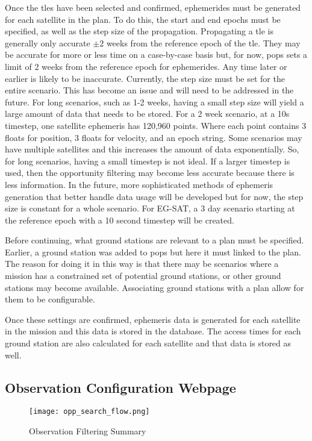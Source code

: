 Once the \glspl{tle} have been selected and confirmed, ephemerides must be
generated for each satellite in the plan. To do this, the start and end epochs
must be specified, as well as the step size of the propagation. Propagating a
\gls{tle} is generally only accurate $\pm 2$ weeks from the reference epoch of
the \gls{tle}. They may be accurate for more or less time on a case-by-case
basis but, for now, \gls{pops} sets a limit of 2 weeks from the reference epoch
for ephemerides. Any time later or earlier is likely to be inaccurate.
Currently, the step size must be set for the entire scenario. This has become
an issue and will need to be addressed in the future. For long scenarios, such
as 1-2 weeks, having a small step size will yield a large amount of data that
needs to be stored. For a 2 week scenario, at a 10s timestep, one satellite
ephemeris has 120,960 points.  Where each point contains 3 floats for position,
3 floats for velocity, and an epoch string. Some scenarios may have multiple
satellites and this increases the amount of data exponentially. So, for long
scenarios, having a small timestep is not ideal. If a larger timestep is used,
then the opportunity filtering may become less accurate because there is less
information. In the future, more sophisticated methods of ephemeris generation
that better handle data usage will be developed but for now, the step size is
constant for a whole scenario. For EG-SAT, a 3 day scenario starting at the
reference epoch with a 10 second timestep will be created. 

Before continuing, what ground stations are relevant to a plan must be
specified.  Earlier, a ground station was added to \gls{pops} but here it must
linked to the plan. The reason for doing it in this way is that there may be
scenarios where a mission has a constrained set of potential ground stations,
or other ground stations may become available. Associating ground stations with
a plan allow for them to be configurable. 

Once these settings are confirmed, ephemeris data is generated for each
satellite in the mission and this data is stored in the database. The access
times for each ground station are also calculated for each satellite and that
data is stored as well.


\subsection{Observation Configuration Webpage}

\begin{figure}[h]
    \centering
    \texttt{[image: opp\_search\_flow.png]} 
    \caption{Observation Filtering Summary}
    \label{fig:obs_fil} 
\end{figure}

